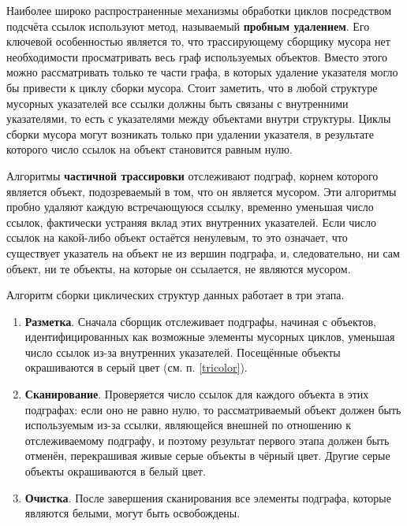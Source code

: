 Наиболее широко распространенные механизмы обработки циклов посредством подсчёта ссылок используют метод, называемый \textbf{пробным удалением}. Его ключевой особенностью является то, что трассирующему сборщику мусора нет необходимости просматривать весь граф используемых объектов. Вместо этого можно рассматривать только те части графа, в которых удаление указателя могло бы привести к циклу сборки мусора. Стоит заметить, что в любой структуре мусорных указателей все ссылки должны быть связаны с внутренними указателями, то есть с указателями между объектами внутри структуры. Циклы сборки мусора могут возникать только при удалении указателя, в результате которого число ссылок на объект становится равным нулю. \cite{handbook}

Алгоритмы \textbf{частичной трассировки} отслеживают подграф, корнем которого является объект, подозреваемый в том, что он является мусором. Эти алгоритмы пробно удаляют каждую встречающуюся ссылку, временно уменьшая число ссылок, фактически устраняя вклад этих внутренних указателей. Если число ссылок на какой-либо объект остаётся ненулевым, то это означает, что существует указатель на объект не из вершин подграфа, и, следовательно, ни сам объект, ни те объекты, на которые он ссылается, не являются мусором. \cite{handbook}

Алгоритм сборки циклических структур данных работает в три этапа. \cite{handbook}

\begin{enumerate}[label*=\arabic*.]
	\item \textbf{Разметка}. 
	Сначала сборщик отслеживает подграфы, начиная с объектов, идентифицированных как возможные элементы мусорных циклов, уменьшая число ссылок из-за внутренних указателей. Посещённые объекты окрашиваются в серый цвет (см. п. \ref{tricolor}).
	\item \textbf{Сканирование}. 
	Проверяется число ссылок для каждого объекта в этих подграфах: если оно не равно нулю, то рассматриваемый объект должен быть используемым из-за ссылки, являющейся внешней по отношению к отслеживаемому подграфу, и поэтому результат первого этапа должен быть отменён, перекрашивая живые серые объекты в чёрный цвет. Другие серые объекты окрашиваются в белый цвет.
	\item \textbf{Очистка}. 
	После завершения сканирования все элементы подграфа, которые являются белыми, могут быть освобождены.
\end{enumerate}

